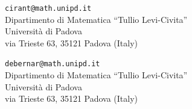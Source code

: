 \documentclass[10pt,a4paper,nouppercase,nowrite]{article}
\numberwithin{equation}{section}
\theoremstyle{definition}
\begin{document}
	
	


\bigskip

\begin{flushright}
\noindent \verb"cirant@math.unipd.it"\\
Dipartimento di Matematica ``Tullio Levi-Civita''\\ Universit\`a di Padova\\
via Trieste 63, 35121 Padova (Italy)

\medskip
\noindent \verb"debernar@math.unipd.it"\\
Dipartimento di Matematica ``Tullio Levi-Civita''\\ Universit\`a di Padova\\
via Trieste 63, 35121 Padova (Italy)
\end{flushright}
\end{document}

